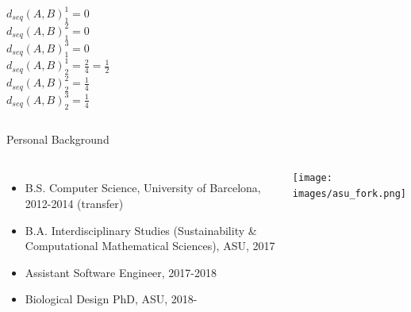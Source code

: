 \documentclass[aspectratio=169]{beamer}
\newcommand{\green}[1]{\textcolor{green}{#1}}
\begin{document}
\begin{frame}[noframenumbering] %
\centering{\resizebox{0.85\linewidth}{!}{%

}}

\vspace{1em}
\begin{columns}
$d_{seq}(A,B)^1_1=0$ \\
$d_{seq}(A,B)^2_1=0$ \\
$d_{seq}(A,B)^3_1=0$ \\
$d_{seq}(A,B)^1_2=\frac{2}{4}=\frac{1}{2}$ \\
$d_{seq}(A,B)^2_2=\frac{1}{4}$ \\
$d_{seq}(A,B)^3_2=\frac{1}{4}$ \\
\end{columns}
\end{frame} %

\begin{frame}{Personal Background}%
\begin{columns}
\begin{itemize}
	\setlength\itemsep{1em}
	\item B.S. Computer Science, University of Barcelona, 2012-2014 (transfer)
	\item B.A. Interdisciplinary Studies (Sustainability \& Computational
		Mathematical Sciences), ASU, 2017
	\item Assistant Software Engineer, 2017-2018
	\item Biological Design PhD, ASU, 2018-
\end{itemize}
\texttt{[image: images/asu\_fork.png]}
\end{columns}
\end{frame} %
\end{document}
